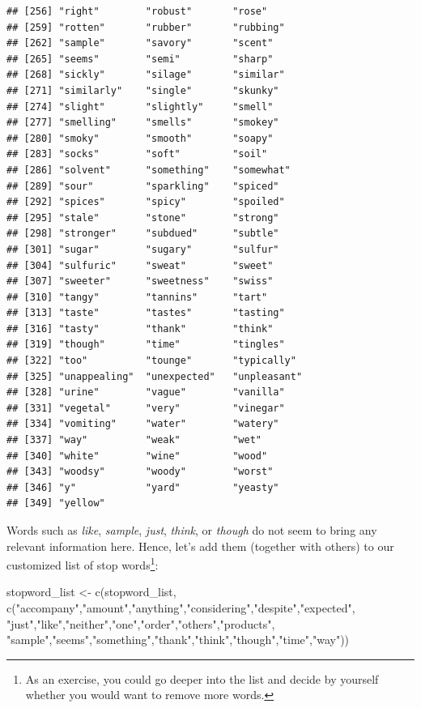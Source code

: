 \documentclass[
]{krantz}
\makeatletter
\newenvironment{Shaded}{\begin{snugshade}}{\end{snugshade}}
\newcommand{\FunctionTok}[1]{\textcolor[rgb]{0,0,0}{#1}}
\newcommand{\NormalTok}[1]{#1}
\newcommand{\OtherTok}[1]{\textcolor[rgb]{0.37,0.37,0.37}{#1}}
\newcommand{\StringTok}[1]{\textcolor[rgb]{0.5,0.5,0.5}{#1}}
\newenvironment{kframe}{%
\medskip{}
\setlength{\fboxsep}{.8em}
 \def\at@end@of@kframe{}%
 \ifinner\ifhmode%
  \def\at@end@of@kframe{\end{minipage}}%
  \begin{minipage}{\columnwidth}%
 \fi\fi%
 \def\FrameCommand##1{\hskip\@totalleftmargin \hskip-\fboxsep
 \colorbox{shadecolor}{##1}\hskip-\fboxsep
     \hskip-\linewidth \hskip-\@totalleftmargin \hskip\columnwidth}%
 \MakeFramed {\advance\hsize-\width
   \@totalleftmargin\z@ \linewidth\hsize
   \@setminipage}}%
 {\par\unskip\endMakeFramed%
 \at@end@of@kframe}
\renewenvironment{Shaded}{\begin{kframe}}{\end{kframe}}
\makeatother
\begin{document}
\begin{verbatim}
## [256] "right"        "robust"       "rose"        
## [259] "rotten"       "rubber"       "rubbing"     
## [262] "sample"       "savory"       "scent"       
## [265] "seems"        "semi"         "sharp"       
## [268] "sickly"       "silage"       "similar"     
## [271] "similarly"    "single"       "skunky"      
## [274] "slight"       "slightly"     "smell"       
## [277] "smelling"     "smells"       "smokey"      
## [280] "smoky"        "smooth"       "soapy"       
## [283] "socks"        "soft"         "soil"        
## [286] "solvent"      "something"    "somewhat"    
## [289] "sour"         "sparkling"    "spiced"      
## [292] "spices"       "spicy"        "spoiled"     
## [295] "stale"        "stone"        "strong"      
## [298] "stronger"     "subdued"      "subtle"      
## [301] "sugar"        "sugary"       "sulfur"      
## [304] "sulfuric"     "sweat"        "sweet"       
## [307] "sweeter"      "sweetness"    "swiss"       
## [310] "tangy"        "tannins"      "tart"        
## [313] "taste"        "tastes"       "tasting"     
## [316] "tasty"        "thank"        "think"       
## [319] "though"       "time"         "tingles"     
## [322] "too"          "tounge"       "typically"   
## [325] "unappealing"  "unexpected"   "unpleasant"  
## [328] "urine"        "vague"        "vanilla"     
## [331] "vegetal"      "very"         "vinegar"     
## [334] "vomiting"     "water"        "watery"      
## [337] "way"          "weak"         "wet"         
## [340] "white"        "wine"         "wood"        
## [343] "woodsy"       "woody"        "worst"       
## [346] "y"            "yard"         "yeasty"      
## [349] "yellow"
\end{verbatim}

Words such as \emph{like}, \emph{sample}, \emph{just}, \emph{think}, or \emph{though} do not seem to bring any relevant information here. Hence, let's add them (together with others) to our customized list of stop words\footnote{As an exercise, you could go deeper into the list and decide by yourself whether you would want to remove more words.}:

\begin{Shaded}
\begin{Highlighting}[]
\NormalTok{stopword\_list }\OtherTok{\textless{}{-}} \FunctionTok{c}\NormalTok{(stopword\_list, }\FunctionTok{c}\NormalTok{(}\StringTok{"accompany"}\NormalTok{,}\StringTok{"amount"}\NormalTok{,}\StringTok{"anything"}\NormalTok{,}\StringTok{"considering"}\NormalTok{,}\StringTok{"despite"}\NormalTok{,}\StringTok{"expected"}\NormalTok{,}
                                    \StringTok{"just"}\NormalTok{,}\StringTok{"like"}\NormalTok{,}\StringTok{"neither"}\NormalTok{,}\StringTok{"one"}\NormalTok{,}\StringTok{"order"}\NormalTok{,}\StringTok{"others"}\NormalTok{,}\StringTok{"products"}\NormalTok{,}
                                    \StringTok{"sample"}\NormalTok{,}\StringTok{"seems"}\NormalTok{,}\StringTok{"something"}\NormalTok{,}\StringTok{"thank"}\NormalTok{,}\StringTok{"think"}\NormalTok{,}\StringTok{"though"}\NormalTok{,}\StringTok{"time"}\NormalTok{,}\StringTok{"way"}\NormalTok{))}
\end{Highlighting}
\end{Shaded}
\end{document}
